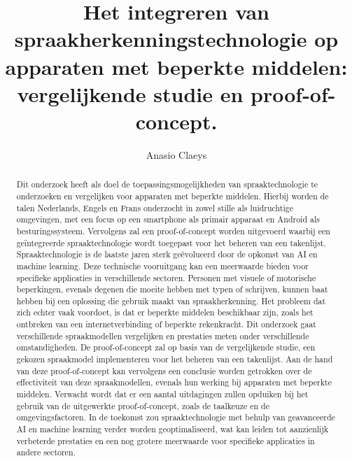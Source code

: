 \documentclass{hogent-article}
\title{Het integreren van spraakherkenningstechnologie op apparaten met beperkte middelen: vergelijkende studie en proof-of-concept.}
\author{Anasio Claeys}
\begin{document}
\begin{abstract}


Dit onderzoek heeft als doel de toepassingsmogelijkheden van spraaktechnologie te onderzoeken en vergelijken voor apparaten met beperkte middelen.
Hierbij worden de talen Nederlands, Engels en Frans onderzocht in zowel stille als luidruchtige omgevingen, met een focus op een smartphone als primair apparaat en Android als besturingssysteem.
Vervolgens zal een 
proof-of-concept worden uitgevoerd waarbij een geïntegreerde spraaktechnologie wordt toegepast voor het beheren van een takenlijst.
Spraaktechnologie is de laatste jaren sterk geëvolueerd door de opkomst van AI en machine learning.
Deze technische vooruitgang kan een meerwaarde bieden voor specifieke applicaties in verschillende sectoren. Personen met visuele of 
motorische beperkingen, evenals degenen die moeite hebben met typen of schrijven, kunnen baat hebben bij een oplossing die gebruik maakt van 
spraakherkenning.
Het probleem dat zich echter vaak voordoet, is dat er beperkte middelen beschikbaar zijn, zoals het ontbreken van een internetverbinding of beperkte rekenkracht. 
Dit onderzoek gaat verschillende spraakmodellen
vergelijken en prestaties meten onder verschillende omstandigheden. De proof-of-concept zal op basis van de vergelijkende studie,
een gekozen spraakmodel implementeren voor het beheren van een takenlijst. Aan de hand van deze proof-of-concept kan vervolgens een conclusie worden getrokken over
de effectiviteit van deze spraakmodellen, evenals hun werking bij apparaten met beperkte middelen. Verwacht wordt dat er een aantal uitdagingen zullen
opduiken bij het gebruik van de uitgewerkte proof-of-concept, zoals de taalkeuze en de omgevingsfactoren. In de toekomst zou
spraaktechnologie met behulp van geavanceerde AI en machine learning verder worden geoptimaliseerd, wat kan leiden tot aanzienlijk verbeterde prestaties en een nog grotere meerwaarde voor specifieke applicaties in andere sectoren.

\end{abstract}

\tableofcontents



\printbibliography[heading=bibintoc]
\end{document}
